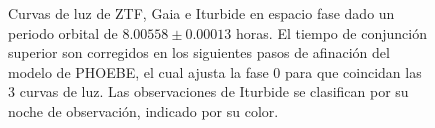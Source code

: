 \begin{figure}[!h]
	\caption{Curvas de luz de ZTF, Gaia e Iturbide en espacio fase dado un
		periodo orbital de $8.00558 \pm 0.00013$ horas. El tiempo de conjunción
		superior son corregidos en los siguientes pasos de afinación del modelo
		de PHOEBE, el cual ajusta la fase 0 para que coincidan las 3 curvas de
		luz. Las observaciones de Iturbide se clasifican por su noche de
		observación, indicado por su color.}
	\label{figuraGaiaIturbideZtfCurvasFase}
\end{figure}
